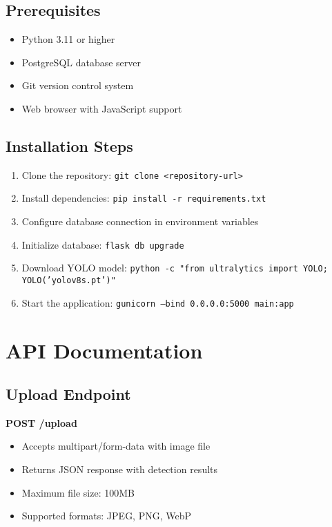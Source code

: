 \documentclass[12pt,a4paper]{report}
\begin{document}
\section{Prerequisites}
\begin{itemize}
    \item Python 3.11 or higher
    \item PostgreSQL database server
    \item Git version control system
    \item Web browser with JavaScript support
\end{itemize}

\section{Installation Steps}
\begin{enumerate}
    \item Clone the repository: \texttt{git clone <repository-url>}
    \item Install dependencies: \texttt{pip install -r requirements.txt}
    \item Configure database connection in environment variables
    \item Initialize database: \texttt{flask db upgrade}
    \item Download YOLO model: \texttt{python -c "from ultralytics import YOLO; YOLO('yolov8s.pt')"}
    \item Start the application: \texttt{gunicorn --bind 0.0.0.0:5000 main:app}
\end{enumerate}

\chapter{API Documentation}

\section{Upload Endpoint}
\textbf{POST /upload}
\begin{itemize}
    \item Accepts multipart/form-data with image file
    \item Returns JSON response with detection results
    \item Maximum file size: 100MB
    \item Supported formats: JPEG, PNG, WebP
\end{itemize}
\end{document}
